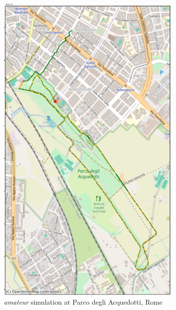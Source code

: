 \begin{figure}[h!]
    \centering
    \begin{subfigure}[t]{0.31\textwidth}
        \centering
        \includegraphics[width=\textwidth]{images/amatour-roma.png}
      \caption{\textit{amateur} simulation at Parco degli Acquedotti, Rome}
    \label{fig:video-amator}
    \end{subfigure}
    \begin{subfigure}[t]{0.305\textwidth}
        \centering

\end{subfigure}
\end{figure}
